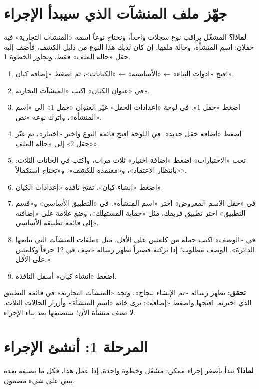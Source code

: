 \section{جهّز ملف المنشآت الذي سيبدأ الإجراء}
\label{sec:entity}
\textbf{لماذا؟} المشغّل يراقب نوع سجلات واحداً، ونحتاج نوعاً اسمه «المنشآت التجارية» فيه حقلان: اسم المنشأة، وحالة ملفها. إن كان لديك هذا النوع من دليل الكشف، فأضف إليه حقل «حالة الملف» فقط، وتجاوز الخطوة 1.

\begin{enumerate}
\item افتح «ادوات البناء» ← «الأساسية» ← «الكيانات»، ثم اضغط «إضافة كيان».
\item في «عنوان الكيان» اكتب «المنشآت التجارية».
\item اضغط «حقل 1». في لوحة «إعدادات الحقل» غيّر العنوان «حقل 1» إلى «اسم المنشأة»، واترك نوعه «نص».
\item اضغط «اضافة حقل جديد». في اللوحة افتح قائمة النوع واختر «اختيار»، ثم غيّر «حقل 2» إلى «حالة الملف».
\item تحت «الاختيارات» اضغط «إضافة اختيار» ثلاث مرات، واكتب في الخانات الثلاث: «بانتظار الاعتماد»، و«معتمدة للكشف»، و«تحتاج استكمالاً».
\item اضغط «انشاء كيان». تفتح نافذة «إعدادات الكيان».
\item في «حقل الاسم المعروض» اختر «اسم المنشأة». في «التطبيق الأساسي» و«قسم التطبيق» اختر تطبيق فريقك، مثل «حماية المستهلك»، وضع علامة على «إضافته إلى قائمة تطبيقه الأساسي».
\item في «الوصف» اكتب جملة من كلمتين على الأقل، مثل «ملفات المنشآت التي تتابعها الدائرة». الوصف مطلوب؛ إذا تركته قصيراً تظهر رسالة «صِف في 12 حرفاً وكلمتين على الأقل.»
\item اضغط «انشاء كيان» أسفل النافذة.
\end{enumerate}
\textbf{تحقق:} تظهر رسالة «تم الإنشاء بنجاح»، وتجد «المنشآت التجارية» في قائمة التطبيق الذي اخترته. افتحها واضغط «إضافة»: ترى خانة «اسم المنشأة» وأزرار الحالات الثلاث. لا تضف منشأة الآن؛ سنضيفها بعد بناء الإجراء.

\section{المرحلة 1: أنشئ الإجراء}
\label{sec:create}
\textbf{لماذا؟} نبدأ بأصغر إجراء ممكن: مشغّل وخطوة واحدة. إذا عمل هذا، فكل ما نضيفه بعده يبني على شيء مضمون.


